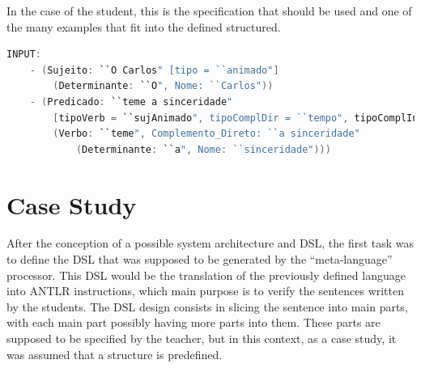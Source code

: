 
In the case of the student, this is the specification that should be used and one of the many examples that fit into the defined structured.

\begin{center}
\begin{minipage}{13cm}
\begin{lstlisting}[language=java, basicstyle=\tiny, label={lst:meta_input}, caption=Example of the students parsing]
INPUT:
    - (Sujeito: ``O Carlos" [tipo = ``animado"]
        (Determinante: ``O", Nome: ``Carlos"))
    - (Predicado: ``teme a sinceridade" 
        [tipoVerb = ``sujAnimado", tipoComplDir = ``tempo", tipoComplInd = ``null"]
        (Verbo: ``teme", Complemento_Direto: ``a sinceridade" 
            (Determinante: ``a", Nome: ``sinceridade")))
\end{lstlisting}
\end{minipage}
\end{center}



\newpage
\section{Case Study}
After the conception of a possible system architecture and DSL, the first task was to define the \textsc{DSL} that was supposed to be generated by the ``meta-language'' processor. This \textsc{DSL} would be the translation of the previously defined language into \textsc{ANTLR} instructions, which main purpose is to verify the sentences written by the students. The \textsc{DSL} design consists in slicing the sentence into main parts, with each main part possibly having more parts into them. These parts are supposed to be specified by the teacher, but in this context, as a case study, it was assumed that a structure is predefined.

